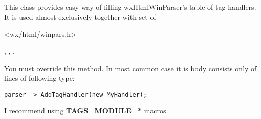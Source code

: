 %

\section{}\label{wxhtmltagsmodule}

This class provides easy way of filling wxHtmlWinParser's table of
tag handlers. It is used almost exclusively together with set of




<wx/html/winpars.h>


,
,
,


\label{wxhtmltagsmodulefillhandlerstable}


You must override this method. In most common case it is body consists
only of lines of following type:

\begin{verbatim}
parser -> AddTagHandler(new MyHandler);
\end{verbatim}

I recommend using {\bf TAGS\_MODULE\_*} macros.



